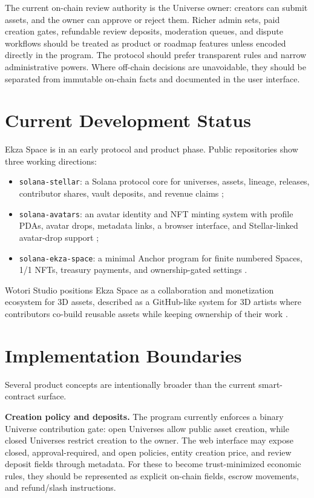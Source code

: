 \documentclass[10pt,twocolumn]{article}
\newcommand{\protocol}[1]{\texttt{#1}}
\begin{document}
The current on-chain review authority is the Universe owner: creators can submit assets, and the owner can approve or reject them. Richer admin sets, paid creation gates, refundable review deposits, moderation queues, and dispute workflows should be treated as product or roadmap features unless encoded directly in the program. The protocol should prefer transparent rules and narrow administrative powers. Where off-chain decisions are unavoidable, they should be separated from immutable on-chain facts and documented in the user interface.

\section{Current Development Status}
Ekza Space is in an early protocol and product phase. Public repositories show three working directions:
\begin{itemize}
    \item \protocol{solana-stellar}: a Solana protocol core for universes, assets, lineage, releases, contributor shares, vault deposits, and revenue claims \cite{solana_stellar};
    \item \protocol{solana-avatars}: an avatar identity and NFT minting system with profile PDAs, avatar drops, metadata links, a browser interface, and Stellar-linked avatar-drop support \cite{solana_avatars};
    \item \protocol{solana-ekza-space}: a minimal Anchor program for finite numbered Spaces, 1/1 NFTs, treasury payments, and ownership-gated settings \cite{solana_ekza_space}.
\end{itemize}

Wotori Studio positions Ekza Space as a collaboration and monetization ecosystem for 3D assets, described as a GitHub-like system for 3D artists where contributors co-build reusable assets while keeping ownership of their work \cite{wotori_site}.

\section{Implementation Boundaries}
Several product concepts are intentionally broader than the current smart-contract surface.

\textbf{Creation policy and deposits.} The program currently enforces a binary Universe contribution gate: open Universes allow public asset creation, while closed Universes restrict creation to the owner. The web interface may expose closed, approval-required, and open policies, entity creation price, and review deposit fields through metadata. For these to become trust-minimized economic rules, they should be represented as explicit on-chain fields, escrow movements, and refund/slash instructions.
\end{document}
